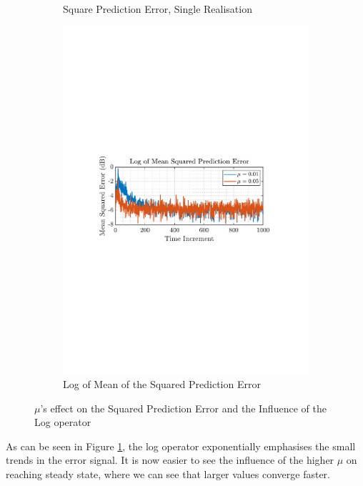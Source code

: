 \documentclass[12pt]{article}
\numberwithin{equation}{section}
\begin{document}
\begin{figure}[H]
\begin{subfigure}{0.49\textwidth}
					\captionsetup{justification=centering}
					\caption{Square Prediction Error, Single Realisation}
				\end{subfigure}
				\begin{subfigure}{0.49\textwidth}
					\centering
					\includegraphics[trim={2.2cm 11.2cm 3.15cm  11.2cm}, clip, width=\textwidth]{../MATLAB/figures/q2_1b_fig03.pdf} 
					\captionsetup{justification=centering}
					\caption{Log of Mean of the Squared Prediction Error}
				\end{subfigure}
				\captionsetup{justification=centering}
				\caption{$\mu$'s effect on the Squared Prediction Error and the Influence of the Log operator}
				\label{fig: 2-1b}
			\end{figure}
		
		As can be seen in Figure \ref{fig: 2-1b}, the log operator exponentially emphasises the small trends in the error signal. It is now easier to see the influence of the higher $\mu$ on reaching steady state, where we can see that larger values converge faster.
		
\end{document}
